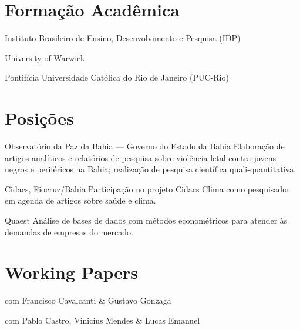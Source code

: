 \documentclass[11pt,a4paper]{article}
\begin{document}
\cvheader

\section{Formação Acadêmica}

      {Instituto Brasileiro de Ensino, Desenvolvimento e Pesquisa (IDP)}{}

      {University of Warwick}{}

      {Pontifícia Universidade Católica do Rio de Janeiro (PUC-Rio)}{}

\section{Posições}

      {Observatório da Paz da Bahia --- Governo do Estado da Bahia}
      {Elaboração de artigos analíticos e relatórios de pesquisa sobre violência letal
       contra jovens negros e periféricos na Bahia; realização de pesquisa científica
       quali-quantitativa.}

      {Cidacs, Fiocruz/Bahia}
      {Participação no projeto Cidacs Clima como pesquisador em agenda de artigos sobre
       saúde e clima.}

      {Quaest}
      {Análise de bases de dados com métodos econométricos para atender às demandas de
       empresas do mercado.}

\section{Working Papers}

      {com Francisco Cavalcanti \& Gustavo Gonzaga}

      {com Pablo Castro, Vinicius Mendes \& Lucas Emanuel}
\end{document}
